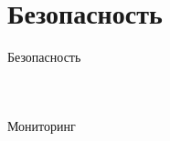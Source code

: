 \documentclass [8pt] {beamer}
\begin{document}
\section{Безопасность}

\begin{frame}
\Huge
\centering
Безопасность
\begin{columns}[T]
\begin{figure}[H]
\end{figure}
\vskip1cm
\begin{figure}[H]
\end{figure}
\end{columns}
\end{frame}

\begin{frame}
\begin{columns}[T]
\vskip2.4cm
\centering
\huge
Мониторинг
\begin{figure}[H]
\end{figure}
\end{columns}
\end{frame}
\end{document}
